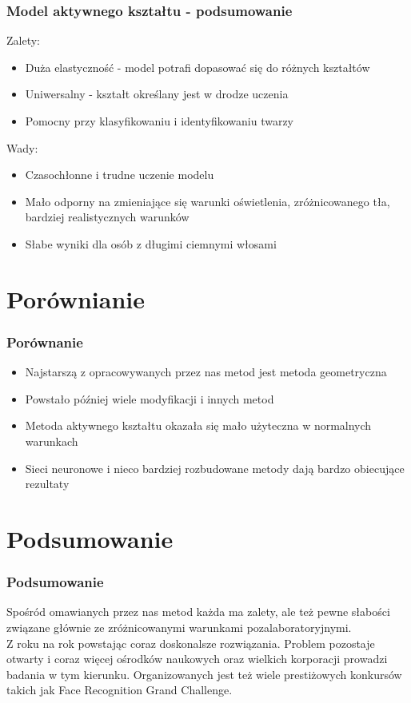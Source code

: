 \documentclass[xcolor=table]{beamer}
\begin{document}
\begin{frame}
  \frametitle{Model aktywnego kształtu - podsumowanie}
    { Zalety:
\begin{itemize}
\item Duża elastyczność - model potrafi dopasować się do różnych kształtów
\item Uniwersalny - kształt określany jest w drodze uczenia
\item Pomocny przy klasyfikowaniu i identyfikowaniu twarzy
\end{itemize}
}
   {\noindent 
Wady:
\begin{itemize}
\item  Czasochłonne i trudne uczenie modelu 
\item  Mało odporny na zmieniające się warunki oświetlenia, zróżnicowanego tła, bardziej realistycznych warunków
\item  Słabe wyniki dla osób z długimi ciemnymi włosami
\end{itemize}}
\end{frame}

\section{Porównianie}

\begin{frame}
  \frametitle{Porównanie}
    \begin{itemize}
\item Najstarszą z opracowywanych przez nas metod jest metoda geometryczna
\item Powstało później wiele modyfikacji i innych metod
\item Metoda aktywnego kształtu okazała się mało użyteczna w normalnych warunkach
\item Sieci neuronowe i nieco bardziej rozbudowane metody dają bardzo obiecujące rezultaty
\end{itemize}

\end{frame}

\section{Podsumowanie}

\begin{frame}
  \frametitle{Podsumowanie}
Spośród omawianych przez nas metod każda ma zalety, ale też pewne słabości związane głównie ze zróżnicowanymi warunkami pozalaboratoryjnymi.\\[\baselineskip] Z roku na rok powstając coraz doskonalsze rozwiązania. Problem pozostaje otwarty i coraz więcej ośrodków naukowych oraz wielkich korporacji prowadzi badania w tym kierunku. Organizowanych jest też wiele prestiżowych konkursów takich jak Face Recognition Grand Challenge.

\end{frame}
\end{document}
